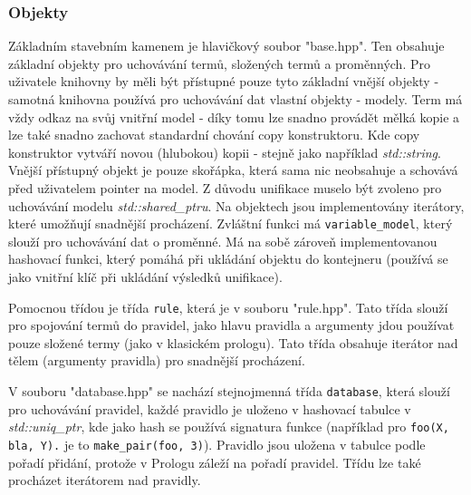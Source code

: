 \documentclass[12pt,a4paper,titlepage]{scrartcl}
\begin{document}
	\subsubsection{Objekty}
	Základním stavebním kamenem je hlavičkový soubor "base.hpp". Ten obsahuje základní objekty pro uchovávání termů, složených termů a proměnných. Pro uživatele knihovny by měli být přístupné pouze tyto základní vnější objekty - samotná knihovna používá pro uchovávání dat vlastní objekty - modely. Term má vždy odkaz na svůj vnitřní model - díky tomu lze snadno provádět mělká kopie a lze také snadno zachovat standardní chování copy konstruktoru. Kde copy konstruktor vytváří novou (hlubokou) kopii - stejně jako například \textit{std::string}. Vnější přístupný objekt je pouze skořápka, která sama nic neobsahuje a schovává před uživatelem pointer na model. Z důvodu unifikace muselo být zvoleno pro uchovávání modelu \textit{std::shared\_ptru}. Na objektech jsou implementovány iterátory, které umožňují snadnější procházení. Zvláštní funkci má \texttt{variable\_model}, který slouží pro uchovávání dat o proměnné. Má na sobě zároveň implementovanou hashovací funkci, který pomáhá při ukládání objektu do kontejneru (používá se jako vnitřní klíč při ukládání výsledků unifikace).
	\par
	Pomocnou třídou je třída \texttt{rule}, která je v souboru "rule.hpp". Tato třída slouží pro spojování termů do pravidel, jako hlavu pravidla a argumenty jdou používat pouze složené termy (jako v klasickém prologu). Tato třída obsahuje iterátor nad tělem (argumenty pravidla) pro snadnější procházení.
	\par
	V souboru "database.hpp" se nachází stejnojmenná třída \texttt{database}, která slouží pro uchovávání pravidel, každé pravidlo je uloženo v hashovací tabulce v \textit{std::uniq\_ptr}, kde jako hash se používá signatura funkce (například pro \texttt{foo(X, bla, Y).} je to \texttt{make\_pair(foo, 3)}). Pravidlo jsou uložena v tabulce podle pořadí přidání, protože v Prologu záleží na pořadí pravidel. Třídu lze také procházet iterátorem nad pravidly.
	
\end{document}
